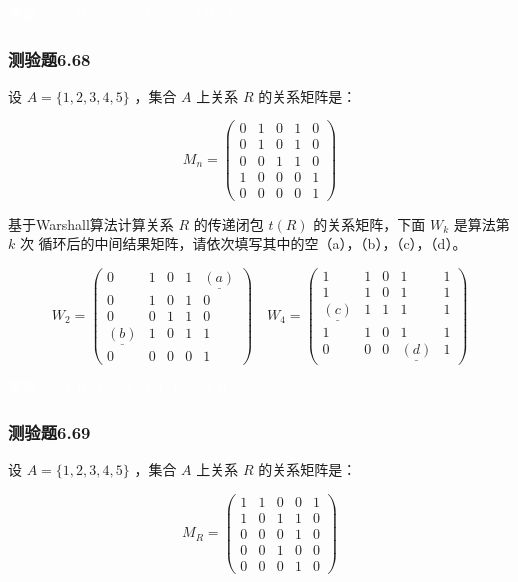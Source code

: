 \documentclass[UTF8, heading=true]{ctexart}
\begin{document}
\textcolor{white}{答案：（a）0 （b）1 （c） 1 （d） 1}

\subsubsection{测验题6.68}

设 $A=\{1,2,3,4,5\}$ ，集合 $A$ 上关系 $R$ 的关系矩阵是：

$$
M_n=\left(\begin{array}{ccccc}
0 & 1 & 0 & 1 & 0 \\
0 & 1 & 0 & 1 & 0 \\
0 & 0 & 1 & 1 & 0 \\
1 & 0 & 0 & 0 & 1 \\
0 & 0 & 0 & 0 & 1
\end{array}\right)
$$


基于Warshall算法计算关系 $R$ 的传递闭包 $t(R)$ 的关系矩阵，下面 $W_k$ 是算法第 $k$ 次
循环后的中间结果矩阵，请依次填写其中的空（a），（b），（c），（d）。

$$
W_2=\left(\begin{array}{ccccc}
0 & 1 & 0 & 1 & \underline{(a)} \\
0 & 1 & 0 & 1 & 0 \\
0 & 0 & 1 & 1 & 0 \\
\underline{(b)} & 1 & 0 & 1 & 1 \\
0 & 0 & 0 & 0 & 1
\end{array}\right) \quad W_4=\left(\begin{array}{ccccc}
1 & 1 & 0 & 1 & 1 \\
1 & 1 & 0 & 1 & 1 \\
\underline{(c)} & 1 & 1 & 1 & 1 \\
1 & 1 & 0 & 1 & 1 \\
0 & 0 & 0 & \underline{(d)} & 1
\end{array}\right)
$$

\textcolor{white}{答案：（a）0 （b）1 （c）1 （d）0}


\subsubsection{测验题6.69}

设 $A=\{1,2,3,4,5\}$ ，集合 $A$ 上关系 $R$ 的关系矩阵是：

$$M_R=\left(\begin{array}{lllll}1 & 1 & 0 & 0 & 1 \\ 1 & 0 & 1 & 1 & 0 \\ 0 & 0 & 0 & 1 & 0 \\ 0 & 0 & 1 & 0 & 0 \\ 0 & 0 & 0 & 1 & 0\end{array}\right)$$
\end{document}
